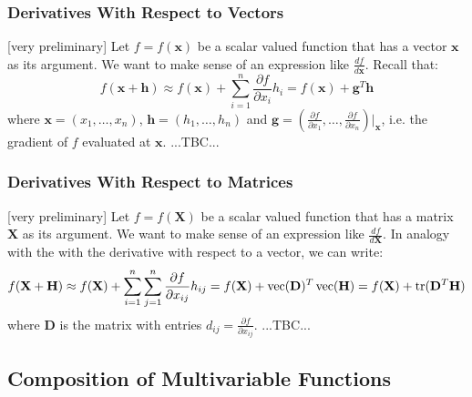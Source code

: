 \subsubsection{Derivatives With Respect to Vectors}  [very preliminary]
Let $f = f(\mathbf{x})$ be a scalar valued function that has a vector $\mathbf{x}$ as its argument. We want to make sense of an expression like $\frac{d f}{d \mathbf{x}}$. Recall that:
\begin{equation}
f(\mathbf{x + h}) \approx 
f(\mathbf{x}) + \sum_{i=1}^{n} \frac{\partial f}{\partial x_i} h_i =
f(\mathbf{x}) + \mathbf{g}^T \mathbf{h}
\end{equation}
where $\mathbf{x} = (x_1,\ldots,x_n)$, $\mathbf{h} = (h_1,\ldots,h_n)$ and $\mathbf{g} = (\frac{\partial f}{\partial x_1},\ldots,\frac{\partial f}{\partial x_n})|_{\mathbf{x}}$, i.e. the gradient of $f$ evaluated at $\mathbf{x}$. ...TBC...



\subsubsection{Derivatives With Respect to Matrices}  [very preliminary]
Let $f = f(\mathbf{X})$ be a scalar valued function that has a matrix $\mathbf{X}$ as its argument. We want to make sense of an expression like $\frac{d f}{d \mathbf{X}}$. In analogy with the with the derivative with respect to a vector, we can write:
\begin{equation}
f(\mathbf{X + H}) \approx 
f(\mathbf{X}) + \sum_{i=1}^{n} \sum_{j=1}^{n} \frac{\partial f}{\partial x_{ij}} h_{ij} =
f(\mathbf{X}) + \operatorname{vec}(\mathbf{D})^T \operatorname{vec}(\mathbf{H}) =
f(\mathbf{X}) + \operatorname{tr}(\mathbf{D}^T \mathbf{H})
\end{equation}
where $\mathbf{D}$ is the matrix with entries $d_{ij} = \frac{\partial f}{\partial x_{ij}}$. ...TBC...





\subsection{Composition of Multivariable Functions}

